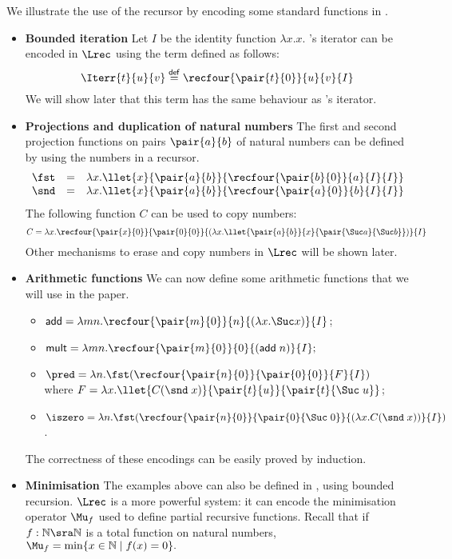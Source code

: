 \documentclass{article}
\begin{document}
\begin{example}\label{sec:Lrecex}
We illustrate the use of the recursor by encoding some standard functions in \LLCIrec.
\begin{itemize}
\item \textbf{Bounded iteration}
  Let $I$ be the
identity function $\lambda x.x$. \LLCI's iterator can be encoded in $\Lrec$ using
the term   defined as follows:
$$\Iterr{t}{u}{v} \stackrel{\mathsf{def}}{=} \recfour{\pair{t}{0}}{u}{v}{I}$$
We will show later that this term  has the same behaviour
as \LLCI's iterator.

\item  \textbf{Projections and duplication of natural numbers}
The first and second projection functions on pairs $\pair{a}{b}$ of
natural numbers can be defined  by using the numbers in a recursor.
\[
\begin{array}{lcl}
\fst  &=& \lambda x.\llet{x}{\pair{a}{b}}{\recfour{\pair{b}{0}}{a}{I}{I}}\\
\snd  &=& \lambda x.\llet{x}{\pair{a}{b}}{\recfour{\pair{a}{0}}{b}{I}{I}}
\end{array}
\]
The following function $C$ can be used to copy numbers:
$$C = \lambda x.\recfour{\pair{x}{0}}{\pair{0}{0}}{(\lambda x.\llet{\pair{a}{b}}{x}{\pair{\Suc a}{\Suc b}})}{I}$$
Other
mechanisms to erase and copy numbers in $\Lrec$ will be shown later.

\item  \textbf{Arithmetic functions}
We can now define some arithmetic functions that we will use in the paper.
\begin{itemize}
\item $\mathsf{add} = \lambda m n. \recfour{\pair{m}{0}}{n}{(\lambda x. \Suc x)}{I}$;
\item $\mathsf{mult} = \lambda m n. \recfour{\pair{m}{0}}{0}{(\mathsf{add}\; n)}{I};$
\item $\pred = \lambda n.\fst(\recfour{\pair{n}{0}}{\pair{0}{0}}{F}{I})$\\
where $F = \lambda x.\llet{C(\snd\;x)}{\pair{t}{u}}{\pair{t}{\Suc\;u}}$;
\item $\iszero = \lambda n.\fst(\recfour{\pair{n}{0}}{\pair{0}{\Suc\;0}}{(\lambda x.C(\snd\;x))}{I})$.
\end{itemize}
The correctness of these encodings can be easily proved by induction.

\item  \textbf{Minimisation}
\label{ex:min}
The examples above can also be defined in \LLCI, using bounded
recursion. $\Lrec$ is a more powerful system:  it can encode the
minimisation operator $\Mu_f$ used to define partial recursive
functions.  Recall that if $f: \mathbb{N}\sra \mathbb{N}$ is a total
function on natural numbers, $\Mu_f = \min \{ x\in \mathbb{N} \mid
f(x) = 0 \}.$


\end{itemize}
\end{example}
\end{document}
